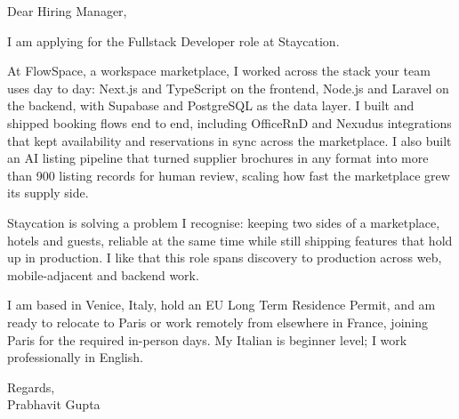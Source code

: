 \documentclass[a4paper,11pt]{article}
\begin{document}
Dear Hiring Manager,

I am applying for the Fullstack Developer role at Staycation.

At FlowSpace, a workspace marketplace, I worked across the stack your team uses day to day: Next.js and TypeScript on the frontend, Node.js and Laravel on the backend, with Supabase and PostgreSQL as the data layer. I built and shipped booking flows end to end, including OfficeRnD and Nexudus integrations that kept availability and reservations in sync across the marketplace. I also built an AI listing pipeline that turned supplier brochures in any format into more than 900 listing records for human review, scaling how fast the marketplace grew its supply side.

Staycation is solving a problem I recognise: keeping two sides of a marketplace, hotels and guests, reliable at the same time while still shipping features that hold up in production. I like that this role spans discovery to production across web, mobile-adjacent and backend work.

I am based in Venice, Italy, hold an EU Long Term Residence Permit, and am ready to relocate to Paris or work remotely from elsewhere in France, joining Paris for the required in-person days. My Italian is beginner level; I work professionally in English.

Regards,\\
Prabhavit Gupta
\end{document}
